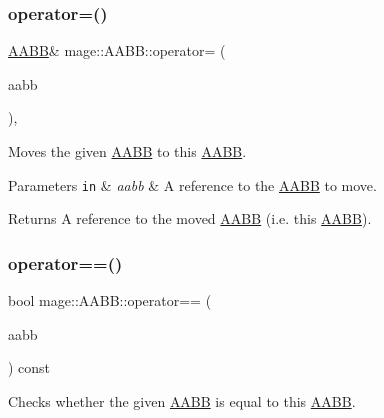 \subsubsection{\texorpdfstring{operator=()}{operator=()}\hspace{0.1cm}{\footnotesize\ttfamily [2/2]}}
{\footnotesize\ttfamily \hyperlink{classmage_1_1_a_a_b_b}{A\+A\+BB}\& mage\+::\+A\+A\+B\+B\+::operator= (\begin{DoxyParamCaption}\item[{\hyperlink{classmage_1_1_a_a_b_b}{A\+A\+BB} \&\&}]{aabb }\end{DoxyParamCaption})\hspace{0.3cm}{\ttfamily [default]}, {\ttfamily [noexcept]}}

Moves the given \hyperlink{classmage_1_1_a_a_b_b}{A\+A\+BB} to this \hyperlink{classmage_1_1_a_a_b_b}{A\+A\+BB}.


\begin{DoxyParams}[1]{Parameters}
\mbox{\tt in}  & {\em aabb} & A reference to the \hyperlink{classmage_1_1_a_a_b_b}{A\+A\+BB} to move. \\
\hline
\end{DoxyParams}
\begin{DoxyReturn}{Returns}
A reference to the moved \hyperlink{classmage_1_1_a_a_b_b}{A\+A\+BB} (i.\+e. this \hyperlink{classmage_1_1_a_a_b_b}{A\+A\+BB}). 
\end{DoxyReturn}
\hypertarget{classmage_1_1_a_a_b_b_a9297ff005f7bdcd934d744a6fb7ab5c9}{}\label{classmage_1_1_a_a_b_b_a9297ff005f7bdcd934d744a6fb7ab5c9} 
\subsubsection{\texorpdfstring{operator==()}{operator==()}}
{\footnotesize\ttfamily bool mage\+::\+A\+A\+B\+B\+::operator== (\begin{DoxyParamCaption}\item[{const \hyperlink{classmage_1_1_a_a_b_b}{A\+A\+BB} \&}]{aabb }\end{DoxyParamCaption}) const\hspace{0.3cm}{\ttfamily [noexcept]}}

Checks whether the given \hyperlink{classmage_1_1_a_a_b_b}{A\+A\+BB} is equal to this \hyperlink{classmage_1_1_a_a_b_b}{A\+A\+BB}.


